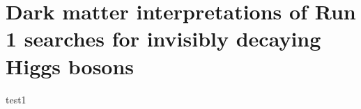 \chapter{Dark matter interpretations of Run 1 searches for invisibly decaying Higgs bosons}
\label{chap:introduction}
test1 \citep{pdg}
